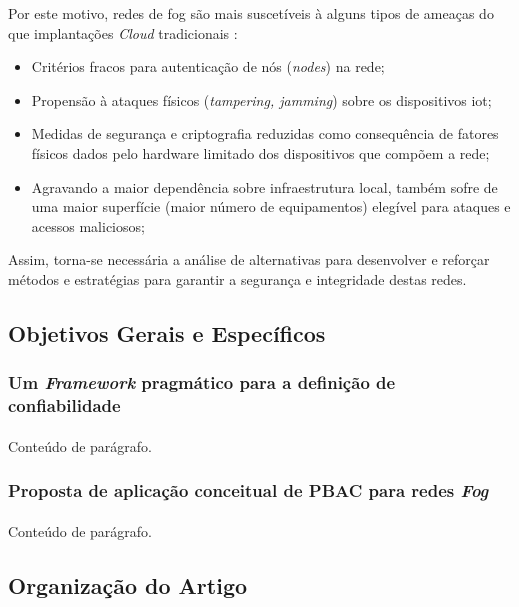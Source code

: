 \documentclass[12pt]{article}
\begin{document}
Por este motivo, redes de \gls{fog} são mais suscetíveis à alguns tipos de ameaças do que implantações \textit{Cloud}
tradicionais \cite{alhazmi2019,srirama2024,khan2017}:
\begin{itemize}
  \item Critérios fracos para autenticação de nós (\textit{nodes}) na rede;
  \item Propensão à ataques físicos (\textit{tampering, jamming}) sobre os dispositivos \gls{iot};
  \item Medidas de segurança e criptografia reduzidas como consequência de  fatores físicos dados pelo hardware limitado
    dos dispositivos que compõem a rede;
  \item Agravando a maior dependência sobre infraestrutura local, também sofre de uma maior superfície (maior número de equipamentos)
    elegível para ataques e acessos maliciosos;
\end{itemize}

Assim, torna-se necessária a análise de alternativas para desenvolver e reforçar métodos e estratégias para garantir a
segurança e integridade destas redes.

\subsection{Objetivos Gerais e Específicos}
\subsubsection{Um \textit{Framework} pragmático para a definição de confiabilidade}
\paragraph{}
Conteúdo de parágrafo.

\subsubsection{Proposta de aplicação conceitual de PBAC para redes \textit{Fog}}
\paragraph{}
Conteúdo de parágrafo.

\subsection{Organização do Artigo}
\end{document}
